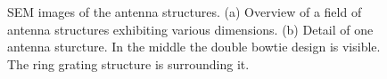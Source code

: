 	\begin{figure}[tp]
		\begin{subfigure}[t]{ 0.49\linewidth}
			\centering
			\caption{}
			\label{subfig::antenna_structures_sem}
		\end{subfigure}
		\hfill
		\begin{subfigure}[t]{ 0.49\linewidth}
			\centering
			\caption{}
			\label{subfig::antenna_one_structure_sem}
		\end{subfigure}
		\caption{SEM images of the antenna structures. (a) Overview of a field of antenna structures exhibiting various dimensions. (b) Detail of one antenna sturcture. In the middle the double bowtie design is visible. The ring grating structure is surrounding it.}
	\end{figure}

